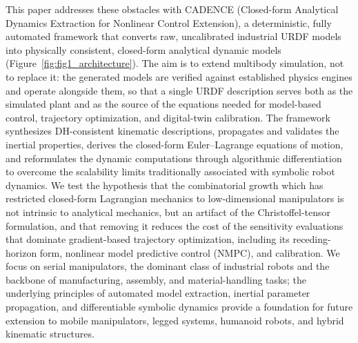 \documentclass[fleqn,10pt]{article}
\begin{document}
This paper addresses these obstacles with CADENCE (Closed-form Analytical Dynamics Extraction for Nonlinear Control Extension), a deterministic, fully automated framework that converts raw, uncalibrated industrial URDF models into physically consistent, closed-form analytical dynamic models (Figure~\ref{fig:fig1_architecture}). The aim is to extend multibody simulation, not to replace it: the generated models are verified against established physics engines and operate alongside them, so that a single URDF description serves both as the simulated plant and as the source of the equations needed for model-based control, trajectory optimization, and digital-twin calibration. The framework synthesizes DH-consistent kinematic descriptions, propagates and validates the inertial properties, derives the closed-form Euler--Lagrange equations of motion, and reformulates the dynamic computations through algorithmic differentiation to overcome the scalability limits traditionally associated with symbolic robot dynamics. We test the hypothesis that the combinatorial growth which has restricted closed-form Lagrangian mechanics to low-dimensional manipulators is not intrinsic to analytical mechanics, but an artifact of the Christoffel-tensor formulation, and that removing it reduces the cost of the sensitivity evaluations that dominate gradient-based trajectory optimization, including its receding-horizon form, nonlinear model predictive control (NMPC), and calibration. We focus on serial manipulators, the dominant class of industrial robots and the backbone of manufacturing, assembly, and material-handling tasks; the underlying principles of automated model extraction, inertial parameter propagation, and differentiable symbolic dynamics provide a foundation for future extension to mobile manipulators, legged systems, humanoid robots, and hybrid kinematic structures.
\end{document}
